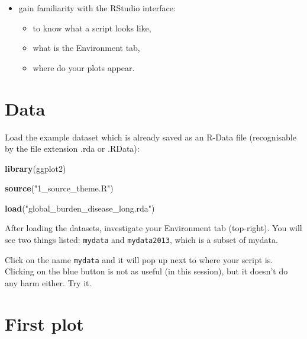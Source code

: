 \documentclass[]{book}
\makeatletter
\newenvironment{Shaded}{\begin{snugshade}}{\end{snugshade}}
\newcommand{\KeywordTok}[1]{\textcolor[rgb]{0.13,0.29,0.53}{\textbf{#1}}}
\newcommand{\DataTypeTok}[1]{\textcolor[rgb]{0.13,0.29,0.53}{#1}}
\newcommand{\StringTok}[1]{\textcolor[rgb]{0.31,0.60,0.02}{#1}}
\newcommand{\CommentTok}[1]{\textcolor[rgb]{0.56,0.35,0.01}{\textit{#1}}}
\newcommand{\OperatorTok}[1]{\textcolor[rgb]{0.81,0.36,0.00}{\textbf{#1}}}
\newcommand{\NormalTok}[1]{#1}
\providecommand{\tightlist}{%
  \setlength{\itemsep}{0pt}\setlength{\parskip}{0pt}}
\newenvironment{kframe}{%
\medskip{}
\setlength{\fboxsep}{.8em}
 \def\at@end@of@kframe{}%
 \ifinner\ifhmode%
  \def\at@end@of@kframe{\end{minipage}}%
  \begin{minipage}{\columnwidth}%
 \fi\fi%
 \def\FrameCommand##1{\hskip\@totalleftmargin \hskip-\fboxsep
 \colorbox{shadecolor}{##1}\hskip-\fboxsep
     \hskip-\linewidth \hskip-\@totalleftmargin \hskip\columnwidth}%
 \MakeFramed {\advance\hsize-\width
   \@totalleftmargin\z@ \linewidth\hsize
   \@setminipage}}%
 {\par\unskip\endMakeFramed%
 \at@end@of@kframe}
\renewenvironment{Shaded}{\begin{kframe}}{\end{kframe}}
\theoremstyle{definition}
\theoremstyle{definition}
\theoremstyle{definition}
\theoremstyle{remark}
\makeatother
\begin{document}
\begin{itemize}
\tightlist
\item
  gain familiarity with the RStudio interface:

  \begin{itemize}
  \tightlist
  \item
    to know what a script looks like,
  \item
    what is the Environment tab,
  \item
    where do your plots appear.
  \end{itemize}
\end{itemize}

\section{Data}\label{data}

Load the example dataset which is already saved as an R-Data file
(recognisable by the file extension .rda or .RData):

\begin{Shaded}
\begin{Highlighting}[]
\KeywordTok{library}\NormalTok{(ggplot2)}

\KeywordTok{source}\NormalTok{(}\StringTok{"1_source_theme.R"}\NormalTok{)}

\KeywordTok{load}\NormalTok{(}\StringTok{"global_burden_disease_long.rda"}\NormalTok{)}
\end{Highlighting}
\end{Shaded}

After loading the datasets, investigate your Environment tab
(top-right). You will see two things listed: \texttt{mydata} and
\texttt{mydata2013}, which is a subset of mydata.

Click on the name \texttt{mydata} and it will pop up next to where your
script is. Clicking on the blue button is not as useful (in this
session), but it doesn't do any harm either. Try it.

\section{First plot}\label{first-plot}

\begin{Shaded}
\end{Shaded}
\end{document}
